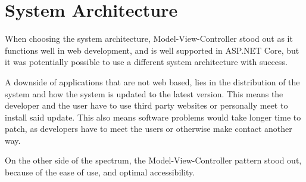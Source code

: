 \section{System Architecture}
When choosing the system architecture, Model-View-Controller stood out as it functions well in web development, and is well supported in ASP.NET Core, but it was potentially possible to use a different system architecture with success.

A downside of applications that are not web based, lies in the distribution of the system and how the system is updated to the latest version.
This means the developer and the user have to use third party websites or personally meet to install said update.
This also means software problems would take longer time to patch, as developers have to meet the users or otherwise make contact another way.

On the other side of the spectrum, the Model-View-Controller pattern stood out, because of the ease of use, and optimal accessibility.
